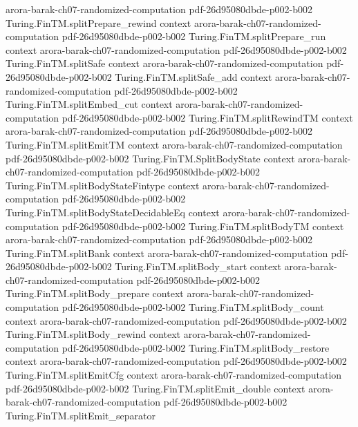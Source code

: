 \begin{theorem}
  {arora-barak-ch07-randomized-computation}
  {pdf-26d95080dbde-p002-b002}
\proofstep
  {Turing.FinTM.splitPrepare_rewind}
  {context}
  {arora-barak-ch07-randomized-computation}
  {pdf-26d95080dbde-p002-b002}
\proofstep
  {Turing.FinTM.splitPrepare_run}
  {context}
  {arora-barak-ch07-randomized-computation}
  {pdf-26d95080dbde-p002-b002}
\proofstep
  {Turing.FinTM.splitSafe}
  {context}
  {arora-barak-ch07-randomized-computation}
  {pdf-26d95080dbde-p002-b002}
\proofstep
  {Turing.FinTM.splitSafe_add}
  {context}
  {arora-barak-ch07-randomized-computation}
  {pdf-26d95080dbde-p002-b002}
\proofstep
  {Turing.FinTM.splitEmbed_cut}
  {context}
  {arora-barak-ch07-randomized-computation}
  {pdf-26d95080dbde-p002-b002}
\proofstep
  {Turing.FinTM.splitRewindTM}
  {context}
  {arora-barak-ch07-randomized-computation}
  {pdf-26d95080dbde-p002-b002}
\proofstep
  {Turing.FinTM.splitEmitTM}
  {context}
  {arora-barak-ch07-randomized-computation}
  {pdf-26d95080dbde-p002-b002}
\proofstep
  {Turing.FinTM.SplitBodyState}
  {context}
  {arora-barak-ch07-randomized-computation}
  {pdf-26d95080dbde-p002-b002}
\proofstep
  {Turing.FinTM.splitBodyStateFintype}
  {context}
  {arora-barak-ch07-randomized-computation}
  {pdf-26d95080dbde-p002-b002}
\proofstep
  {Turing.FinTM.splitBodyStateDecidableEq}
  {context}
  {arora-barak-ch07-randomized-computation}
  {pdf-26d95080dbde-p002-b002}
\proofstep
  {Turing.FinTM.splitBodyTM}
  {context}
  {arora-barak-ch07-randomized-computation}
  {pdf-26d95080dbde-p002-b002}
\proofstep
  {Turing.FinTM.splitBank}
  {context}
  {arora-barak-ch07-randomized-computation}
  {pdf-26d95080dbde-p002-b002}
\proofstep
  {Turing.FinTM.splitBody_start}
  {context}
  {arora-barak-ch07-randomized-computation}
  {pdf-26d95080dbde-p002-b002}
\proofstep
  {Turing.FinTM.splitBody_prepare}
  {context}
  {arora-barak-ch07-randomized-computation}
  {pdf-26d95080dbde-p002-b002}
\proofstep
  {Turing.FinTM.splitBody_count}
  {context}
  {arora-barak-ch07-randomized-computation}
  {pdf-26d95080dbde-p002-b002}
\proofstep
  {Turing.FinTM.splitBody_rewind}
  {context}
  {arora-barak-ch07-randomized-computation}
  {pdf-26d95080dbde-p002-b002}
\proofstep
  {Turing.FinTM.splitBody_restore}
  {context}
  {arora-barak-ch07-randomized-computation}
  {pdf-26d95080dbde-p002-b002}
\proofstep
  {Turing.FinTM.splitEmitCfg}
  {context}
  {arora-barak-ch07-randomized-computation}
  {pdf-26d95080dbde-p002-b002}
\proofstep
  {Turing.FinTM.splitEmit_double}
  {context}
  {arora-barak-ch07-randomized-computation}
  {pdf-26d95080dbde-p002-b002}
\proofstep
  {Turing.FinTM.splitEmit_separator}

\end{theorem}
